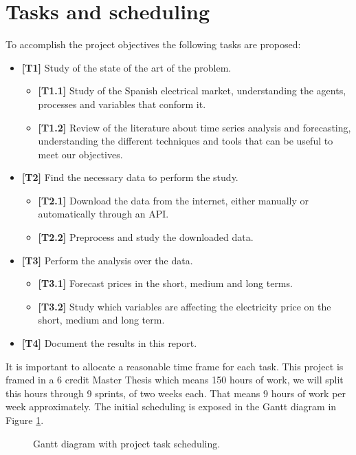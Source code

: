 \section{Tasks and scheduling}
To accomplish the project objectives the following tasks are proposed:
\begin{itemize}
    \item \textbf{[T1]} Study of the state of the art of the problem.
    \begin{itemize}
        \item \textbf{[T1.1]} Study of the Spanish electrical market, understanding the agents, processes and variables that conform it.
        \item \textbf{[T1.2]} Review of the literature about time series analysis and forecasting, understanding the different techniques and tools that can be useful to meet our objectives.
    \end{itemize}
    \item \textbf{[T2]} Find the necessary data to perform the study.
    \begin{itemize}
        \item \textbf{[T2.1]} Download the data from the internet, either manually or automatically through an API.
        \item \textbf{[T2.2]} Preprocess and study the downloaded data.
    \end{itemize}
    \item \textbf{[T3]} Perform the analysis over the data.
    \begin{itemize}
        \item \textbf{[T3.1]} Forecast prices in the short, medium and long terms.
        \item \textbf{[T3.2]} Study which variables are affecting the electricity price on the short, medium and long term.
    \end{itemize}
    \item \textbf{[T4]} Document the results in this report.
\end{itemize}

It is important to allocate a reasonable time frame for each task.
This project is framed in a 6 credit Master Thesis which means 150 hours of work, we will split this hours through 9 sprints, of two weeks each. That means 9 hours of work per week approximately. The initial scheduling is exposed in the Gantt diagram in Figure \ref{fig:planning-gantt}.

\begin{figure}[H]
\centering
    \caption{Gantt diagram with project task scheduling.}
    \label{fig:planning-gantt}
\end{figure}